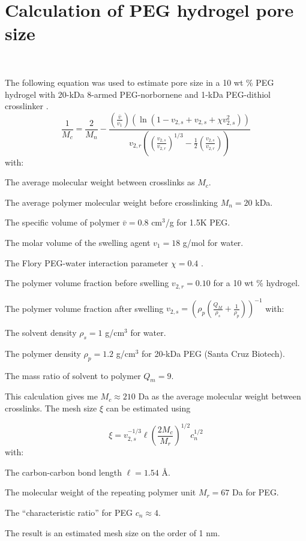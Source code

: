 \chapter{Calculation of PEG hydrogel pore size}~\label{appx:pore-calc}


The following equation was used to estimate pore size in a 10 wt \% PEG hydrogel with 20-kDa 8-armed PEG-norbornene and 1-kDa PEG-dithiol crosslinker \cite{canal89}.
\begin{equation}
\frac{1}{M_c} = \frac{2}{M_n}- \frac{\left(\frac{\bar{v}}{v_1}\right) \left(\ln (1-v_{2,s}+ v_{2,s} + \chi v_{2,s}^2)\right)}{v_{2,r} \left(\left(\frac{v_{2,s}}{v_{2,r}}\right)^{1/3} - \frac{1}{2}\left(\frac{v_{2,s}}{v_{2,r}}\right)\right)}
\end{equation}
with:

The average molecular weight between crosslinks as $M_c$.

The average polymer molecular weight before crosslinking $M_n = 20$ kDa.

The specific volume of polymer $\bar{v} = 0.8$ cm$^3$/g for 1.5K PEG.

The molar volume of the swelling agent $v_1 = 18$ g/mol for water.

The Flory PEG-water interaction parameter $\chi = 0.4$ \cite{mellott01}.

The polymer volume fraction before swelling $v_{2,r} = 0.10$ for a 10 wt \% hydrogel.

The polymer volume fraction after swelling $v_{2,s} = (\rho_p(\frac{Q_M}{\rho_s}+\frac{1}{\rho_p}))^{-1}$ \cite{datta07} with:

The solvent density $\rho_s = 1$ g/cm$^3$ for water.

The polymer density $\rho_p = 1.2$ g/cm$^3$ for 20-kDa PEG (Santa Cruz Biotech).

The mass ratio of solvent to polymer $Q_m = 9$.

This calculation gives me $M_c \approx 210$ Da as the average molecular weight between crosslinks.  The mesh size $\xi$ can be estimated using \cite{canal89}

\begin{equation}
\xi = v_{2,s}^{-1/3} \ell \left(\frac{2M_c}{M_r}\right)^{1/2} c_n^{1/2}
\end{equation}
with:

The carbon-carbon bond length $\ell = 1.54$ \AA.

The molecular weight of the repeating polymer unit $M_r = 67$ Da for PEG.

The ``characteristic ratio'' for PEG $c_n \approx 4$.

The result is an estimated mesh size on the order of 1 nm.

